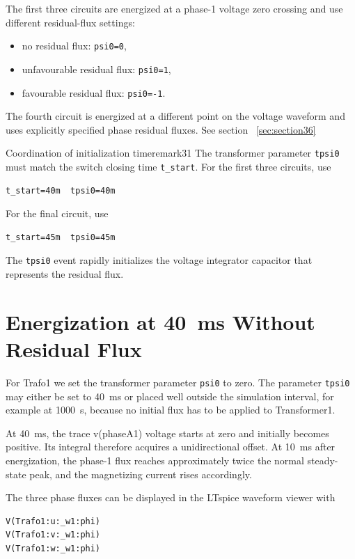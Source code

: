 The first three circuits are energized at a phase-1 voltage zero crossing and
use different residual-flux settings:

\begin{itemize}
\item no residual flux: \texttt{psi0=0},
\item unfavourable residual flux: \texttt{psi0=1},
\item favourable residual flux: \texttt{psi0=-1}.
\end{itemize}

The fourth circuit is energized at a different point on the voltage waveform
and uses explicitly specified phase residual fluxes. See section 
~\ref{sec:section36}
\begin{remark}{Coordination of initialization time}{remark31}
The transformer parameter \texttt{tpsi0} must match the switch closing time
\texttt{t\_start}. For the first three circuits, use
\begin{lstlisting}[style=LTspice]
t_start=40m  tpsi0=40m
\end{lstlisting}
For the final circuit, use
\begin{lstlisting}[style=LTspice]
t_start=45m  tpsi0=45m
\end{lstlisting}
The \texttt{tpsi0} event rapidly initializes the voltage integrator capacitor
that represents the residual flux.
\end{remark}

\section{Energization at \SI{40}{\milli\second} Without Residual Flux}
\label{sec:section33}
For Trafo1 we set the transformer parameter \texttt{psi0} to zero. The parameter
\texttt{tpsi0} may either be set to \SI{40}{\milli\second} or placed well
outside the simulation interval, for example at \SI{1000}{\second}, because no initial flux has to be applied to Transformer1.

At \SI{40}{\milli\second}, the trace v(phaseA1) voltage starts at zero and initially
becomes positive. Its integral therefore acquires a unidirectional offset. At
\SI{10}{\milli\second} after energization, the phase-1 flux reaches
approximately twice the normal steady-state peak, and the magnetizing current
rises accordingly.

The three phase fluxes can be displayed in the LTspice waveform viewer with

\begin{lstlisting}[style=LTspice]
V(Trafo1:u:_w1:phi)
V(Trafo1:v:_w1:phi)
V(Trafo1:w:_w1:phi)
\end{lstlisting}

